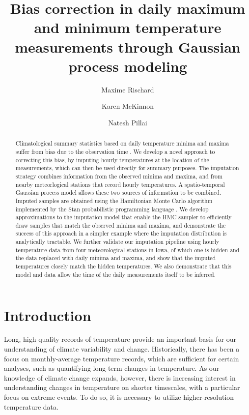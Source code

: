 \documentclass[letter]{article}
\title{
		Bias correction in daily maximum and minimum temperature measurements through Gaussian process modeling
		}
\author[*]{Maxime Rischard}
\author[**]{Karen McKinnon}
\author[*]{Natesh Pillai}
\affil[*]{Department of Statistics, Harvard University}
\affil[**]{National Center for Atmospheric Research}
\renewcommand{\cite}[1]{\citep{#1}}
\begin{document}
    
    
    
    \maketitle
    
\begin{abstract}
	Climatological summary statistics based on daily temperature minima and maxima 
	suffer from bias due to the observation time \cite{baker1975effect}.
	We develop a novel approach to correcting this bias, by imputing hourly temperatures
	at the location of the measurements, which can then be used directly for summary purposes.
	The imputation strategy combines information from the observed minima and maxima,
	and from nearby meteorlogical stations that record hourly temperatures.
	A spatio-temporal Gaussian process model allows these two sources of information to be combined.
	Imputed samples are obtained using the Hamiltonian Monte Carlo algorithm
	implemented by the Stan probabilistic programming language \cite{stancite}.
	We develop approximations to the imputation model 
	that enable the HMC sampler to efficiently draw samples
	that match the observed minima and maxima,
	and demonstrate the success of this approach in a simpler example
	where the imputation distribution is analytically tractable.
	We further validate our imputation pipeline using hourly temperature data 
	from four meteorological stations in Iowa,
	of which one is hidden and the data replaced with daily minima and maxima,
	and show that the imputed temperatures closely match the hidden temperatures.
	We also demonstrate that this model and data allow the 
	time of the daily measurements itself to be inferred.
\end{abstract}

    
	\tableofcontents


    






        \section{Introduction}\label{introduction}
    

Long, high-quality records of temperature provide an important basis for our understanding of climate variability and change. Historically, there has been a focus on monthly-average temperature records, which are sufficient for certain analyses, such as quantifying long-term changes in temperature. As our knowledge of climate change expands, however, there is increasing interest in understanding changes in temperature on shorter timescales, with a particular focus on extreme events. To do so, it is necessary to utilize higher-resolution temperature data. 
\end{document}
